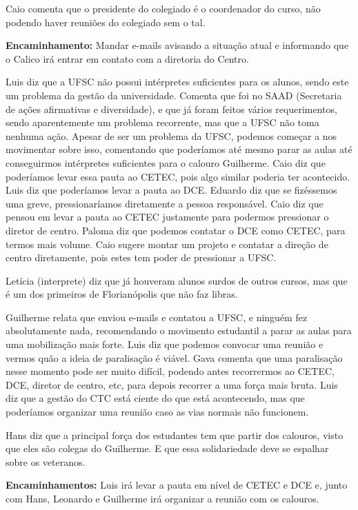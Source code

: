 \documentclass{ata-calico}
\begin{document}
Caio comenta que o presidente do colegiado é o coordenador do curso, não podendo haver reuniões do colegiado sem o tal.\newline

\textbf{Encaminhamento:} Mandar e-mails avisando a situação atual e informando que o Calico irá entrar em contato com a diretoria do Centro.

Luis diz que a UFSC não possui intérpretes suficientes para os alunos, sendo este um problema da gestão da universidade. Comenta que foi no SAAD (Secretaria de ações afirmativas e diversidade), e que já foram feitos vários requerimentos, sendo aparentemente um problema recorrente, mas que a UFSC não toma nenhuma ação. Apesar de ser um problema da UFSC, podemos começar a nos movimentar sobre isso, comentando que poderíamos até mesmo parar as aulas até conseguirmos intérpretes suficientes para o calouro Guilherme. Caio diz que poderíamos levar essa pauta ao CETEC, pois algo similar poderia ter acontecido. Luis diz que poderíamos levar a pauta ao DCE. Eduardo diz que se fizéssemos uma greve, pressionaríamos diretamente a pessoa responsável. Caio diz que pensou em levar a pauta ao CETEC justamente para podermos pressionar o diretor de centro. Paloma diz que podemos contatar o DCE como CETEC, para termos mais volume.
Caio sugere montar um projeto e contatar a direção de centro diretamente, pois estes tem poder de pressionar a UFSC.

Letícia (interprete) diz que já houveram alunos surdos de outros cursos, mas que é um dos primeiros de Florianópolis que não faz libras.

Guilherme relata que enviou e-mails e contatou a UFSC, e ninguém fez absolutamente nada, recomendando o movimento estudantil a parar as aulas para uma mobilização mais forte. Luis diz que podemos convocar uma reunião e vermos quão a ideia de paralisação é viável. Gava comenta que uma paralisação nesse momento pode ser muito difícil, podendo antes recorrermos ao CETEC, DCE, diretor de centro, etc, para depois  recorrer a uma força mais bruta. Luis diz que a gestão do CTC está ciente do que está acontecendo, mas que poderíamos organizar uma reunião caso as vias normais não funcionem.


Hans diz que a principal força dos estudantes tem que partir dos calouros, visto que eles são colegas do Guilherme. E que essa solidariedade deve se espalhar sobre os veteranos.\newline

\textbf{Encaminhamentos:} Luis irá levar a pauta em nível de CETEC e DCE e, junto com Hans, Leonardo e Guilherme irá organizar a reunião com os calouros. 


\end{document}
